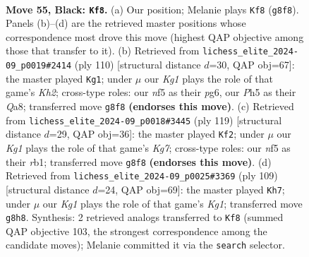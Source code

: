 \documentclass[11pt]{article}
\begin{document}
\clearpage

\begin{figure}[p]\centering
\begin{subfigure}{0.46\textwidth}\centering
\resizebox{\linewidth}{!}{%
\newchessgame
\chessboard[
  setfen={6k1/1p5p/4Q3/5N1p/8/8/5R2/6K1 b - - 0 55},
  showmover=false,
  pgfstyle=straightmove, color=movearrow, markmove={g8-f8}
]}
\caption{}
\end{subfigure}\hfill
\begin{subfigure}{0.46\textwidth}\centering
\resizebox{\linewidth}{!}{%
\newchessgame
\chessboard[
  setfen={Q7/8/6pk/8/5q2/7P/5P1K/8 w - - 21 56},
  showmover=false,
  pgfstyle=straightmove, color=movearrow, markmove={h2-g1}
]}
\caption{}
\end{subfigure}
\\[4pt]
\begin{subfigure}{0.46\textwidth}\centering
\resizebox{\linewidth}{!}{%
\newchessgame
\chessboard[
  setfen={8/1K6/6Q1/8/5p2/8/6kp/1R6 b - - 7 60},
  showmover=false,
  pgfstyle=straightmove, color=movearrow, markmove={g2-f2}
]}
\caption{}
\end{subfigure}\hfill
\begin{subfigure}{0.46\textwidth}\centering
\resizebox{\linewidth}{!}{%
\newchessgame
\chessboard[
  setfen={4Q1k1/6p1/6Np/3K3P/8/8/8/8 b - - 0 55},
  showmover=false,
  pgfstyle=straightmove, color=movearrow, markmove={g8-h7}
]}
\caption{}
\end{subfigure}
\caption{\textbf{Move 55, Black: \texttt{Kf8}.} (a) Our position; Melanie plays \texttt{Kf8} (\texttt{g8f8}). Panels (b)--(d) are the retrieved master positions whose correspondence most drove this move (highest QAP objective among those that transfer to it). (b) Retrieved from \texttt{lichess\_elite\_2024-09\_p0019\#2414} (ply 110) [structural distance $d$=30, QAP obj=67]: the master played \texttt{Kg1}; under $\mu$ our \emph{Kg1} plays the role of that game's \emph{Kh2}; cross-type roles: our \emph{n}f5 as their \emph{p}g6, our \emph{P}h5 as their \emph{Q}a8; transferred move \texttt{g8f8} \textbf{(endorses this move)}. (c) Retrieved from \texttt{lichess\_elite\_2024-09\_p0018\#3445} (ply 119) [structural distance $d$=29, QAP obj=36]: the master played \texttt{Kf2}; under $\mu$ our \emph{Kg1} plays the role of that game's \emph{Kg7}; cross-type roles: our \emph{n}f5 as their \emph{r}b1; transferred move \texttt{g8f8} \textbf{(endorses this move)}. (d) Retrieved from \texttt{lichess\_elite\_2024-09\_p0025\#3369} (ply 109) [structural distance $d$=24, QAP obj=69]: the master played \texttt{Kh7}; under $\mu$ our \emph{Kg1} plays the role of that game's \emph{Kg1}; transferred move \texttt{g8h8}. Synthesis: 2 retrieved analogs transferred to \texttt{Kf8} (summed QAP objective 103, the strongest correspondence among the candidate moves); Melanie committed it via the \texttt{search} selector.}
\label{fig:thought-m109}
\end{figure}
\end{document}
